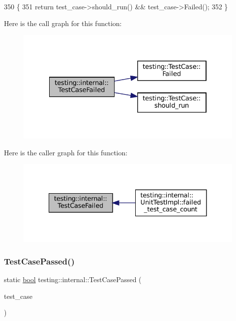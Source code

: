 \begin{DoxyCode}
350                                                       \{
351   \textcolor{keywordflow}{return} test\_case->should\_run() && test\_case->Failed();
352 \}
\end{DoxyCode}
Here is the call graph for this function\+:
\nopagebreak
\begin{figure}[H]
\begin{center}
\leavevmode
\includegraphics[width=322pt]{namespacetesting_1_1internal_a53454b6089c1c5b25319caa9de6c5c02_cgraph}
\end{center}
\end{figure}
Here is the caller graph for this function\+:
\nopagebreak
\begin{figure}[H]
\begin{center}
\leavevmode
\includegraphics[width=328pt]{namespacetesting_1_1internal_a53454b6089c1c5b25319caa9de6c5c02_icgraph}
\end{center}
\end{figure}
\mbox{\label{namespacetesting_1_1internal_aadc7afca7aab40f7f1d41bc17974459a}} 
\subsubsection{\texorpdfstring{Test\+Case\+Passed()}{TestCasePassed()}}
{\footnotesize\ttfamily static \hyperlink{classbool}{bool} testing\+::internal\+::\+Test\+Case\+Passed (\begin{DoxyParamCaption}\item[{const \hyperlink{classtesting_1_1TestCase}{Test\+Case} $\ast$}]{test\+\_\+case }\end{DoxyParamCaption})\hspace{0.3cm}{\ttfamily [static]}}



